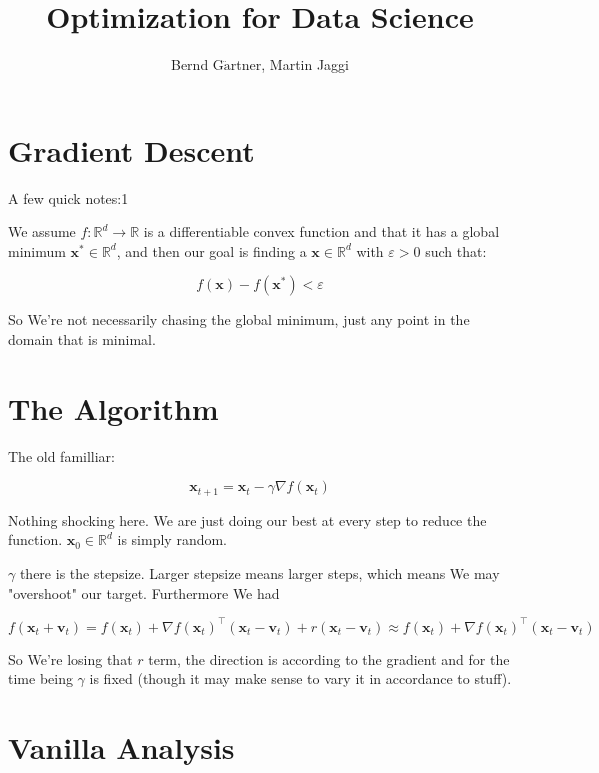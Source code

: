 \documentclass{article}
\begin{document}
\title{Optimization for Data Science}
\author{Bernd G$\ddot{\text{a}}$rtner, Martin Jaggi}
\date{}

\maketitle

\section{Gradient Descent}

	A few quick notes:1	
	
 	We assume $f:\mathbb{R}^d\to\mathbb{R}$ is a differentiable convex function and that it has a global minimum $\mathbf{x}^*\in\mathbb{R}^d$, and then our goal is finding a $\mathbf{x}\in\mathbb{R}^d$ with $\varepsilon > 0$ such that:
 	
 	\[ f(\mathbf{x})  -  f(\mathbf{x}^*) < \varepsilon   \]
	
	So We're not necessarily chasing the global minimum, just any point in the domain that is minimal.
		
\section{The Algorithm}

	The old familliar:
	
	\[ \mathbf{x}_{t+1} = \mathbf{x}_t - \gamma\nabla f(\mathbf{x}_t) \]
	
	Nothing shocking here. We are just doing our best at every step to reduce the function. $\mathbf{x}_0\in\mathbb{R}^d$ is simply random.
	
	$\gamma$ there is the stepsize. Larger stepsize means larger steps, which means We may "overshoot" our target. Furthermore We had
	
	\[ f(\mathbf{x}_t + \mathbf{v}_t) = f(\mathbf{x}_t) + \nabla f(\mathbf{x}_t)^\top (\mathbf{x}_t -\mathbf{v}_t) + r(\mathbf{x}_t -\mathbf{v}_t) \approx  f(\mathbf{x}_t) + \nabla f(\mathbf{x}_t)^\top (\mathbf{x}_t -\mathbf{v}_t) \]
		
	So We're losing that $r$ term, the direction is according to the gradient and for the time being $\gamma$ is fixed (though it may make sense to vary it in accordance to stuff).
	
\section{Vanilla Analysis}
\end{document}
